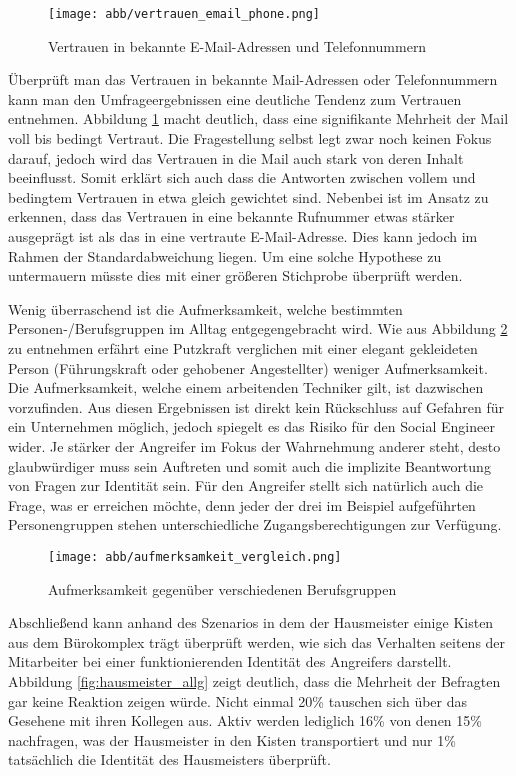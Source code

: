 \begin{figure}[htbp]
	\centering
	\texttt{[image: abb/vertrauen\_email\_phone.png]}
	\caption{Vertrauen in bekannte E-Mail-Adressen und Telefonnummern}
	\label{fig:vertrauen-mail-phone}
\end{figure}

Überprüft man das Vertrauen in bekannte Mail-Adressen oder Telefonnummern kann man den Umfrageergebnissen eine deutliche Tendenz zum Vertrauen entnehmen.
Abbildung \ref{fig:vertrauen-mail-phone} macht deutlich, dass eine signifikante Mehrheit der Mail voll bis bedingt Vertraut.
Die Fragestellung selbst legt zwar noch keinen Fokus darauf, jedoch wird das Vertrauen in die Mail auch stark von deren Inhalt beeinflusst.
Somit erklärt sich auch dass die Antworten zwischen vollem und bedingtem Vertrauen in etwa gleich gewichtet sind.
Nebenbei ist im Ansatz zu erkennen, dass das Vertrauen in eine bekannte Rufnummer etwas stärker ausgeprägt ist als das in eine vertraute E-Mail-Adresse.
Dies kann jedoch im Rahmen der Standardabweichung liegen.
Um eine solche Hypothese zu untermauern müsste dies mit einer größeren Stichprobe überprüft werden.

Wenig überraschend ist die Aufmerksamkeit, welche bestimmten Personen-/Berufsgruppen im Alltag entgegengebracht wird.
Wie aus Abbildung \ref{fig:aufmerksamkeit} zu entnehmen erfährt eine Putzkraft verglichen mit einer elegant gekleideten Person (Führungskraft oder gehobener Angestellter) weniger Aufmerksamkeit.
Die Aufmerksamkeit, welche einem arbeitenden Techniker gilt, ist dazwischen vorzufinden.
Aus diesen Ergebnissen ist direkt kein Rückschluss auf Gefahren für ein Unternehmen möglich, jedoch spiegelt es das Risiko für den Social Engineer wider.
Je stärker der Angreifer im Fokus der Wahrnehmung anderer steht, desto glaubwürdiger muss sein Auftreten und somit auch die implizite Beantwortung von Fragen zur Identität sein.
Für den Angreifer stellt sich natürlich auch die Frage, was er erreichen möchte, denn jeder der drei im Beispiel aufgeführten Personengruppen stehen unterschiedliche Zugangsberechtigungen zur Verfügung.

\begin{figure}[htbp]
	\centering
	\texttt{[image: abb/aufmerksamkeit\_vergleich.png]}
	\caption{Aufmerksamkeit gegenüber verschiedenen Berufsgruppen}
	\label{fig:aufmerksamkeit}
\end{figure}

Abschließend kann anhand des Szenarios in dem der Hausmeister einige Kisten aus dem Bürokomplex trägt überprüft werden, wie sich das Verhalten seitens der Mitarbeiter bei einer funktionierenden Identität des Angreifers darstellt.
Abbildung \ref{fig:hausmeister_allg} zeigt deutlich, dass die Mehrheit der Befragten gar keine Reaktion zeigen würde.
Nicht einmal 20\% tauschen sich über das Gesehene mit ihren Kollegen aus.
Aktiv werden lediglich 16\% von denen 15\% nachfragen, was der Hausmeister in den Kisten transportiert und nur 1\% tatsächlich die Identität des Hausmeisters überprüft.

